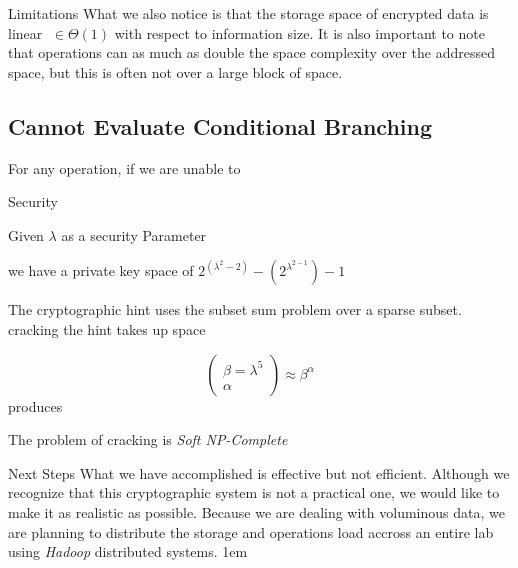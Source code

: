 \documentclass[a0,portrait]{a0poster}
\begin{document}
\begin{multicols}{2}
\begin{slide}{Limitations}
  What we also notice is that the storage space of encrypted data is linear \(\;\in\Theta(1)\) with respect to information size.  It is also important to note that operations can as much as double the space complexity over the addressed space, but this is often not over a large block of space.

\subsection*{Cannot Evaluate Conditional Branching}
For any operation, if we are unable to 

\end{slide}

\begin{slide}{Security}

Given \(\lambda\) as a security Parameter 

we have a private key space of \(2^{(\lambda^2-2)} - (2^{\lambda^{2-1}})-1\)

The cryptographic hint uses the subset sum problem over a sparse subset. cracking the hint takes up space 

\[\left(\begin{matrix}\beta = \lambda^5\\\alpha \end{matrix}\right)\approx \beta^\alpha\] produces


The problem of cracking is {\em Soft NP-Complete}

\end{slide}



\begin{slide}{Next Steps}
  What we have accomplished is effective but not efficient. Although we recognize that this cryptographic system is not a practical one, we would like to make it as realistic as possible. Because we are dealing with voluminous data, we are planning to distribute the storage and operations load accross an entire lab using {\em Hadoop} distributed systems. 
\parskip 1em 


\end{slide}
\end{multicols}
\end{document}
